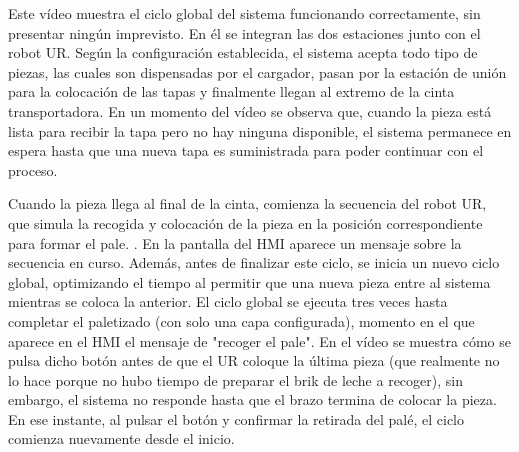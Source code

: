 Este vídeo muestra el ciclo global del sistema funcionando correctamente, sin presentar ningún imprevisto. En él se integran las dos estaciones junto con el robot UR. Según la configuración establecida, el sistema acepta todo tipo de piezas, las cuales son dispensadas por el cargador, pasan por la estación de unión para la colocación de las tapas y finalmente llegan al extremo de la cinta transportadora. En un momento del vídeo se observa que, cuando la pieza está lista para recibir la tapa pero no hay ninguna disponible, el sistema permanece en espera hasta que una nueva tapa es suministrada para poder continuar con el proceso. 

Cuando la pieza llega al final de la cinta, comienza la secuencia del robot UR, que simula la recogida y  colocación de la pieza en la posición correspondiente para formar el pale. . En la pantalla del HMI aparece un mensaje sobre la secuencia en curso. Además, antes de finalizar este ciclo, se inicia un nuevo ciclo global, optimizando el tiempo al permitir que una nueva pieza entre al sistema mientras se coloca la anterior. El ciclo global se ejecuta tres veces hasta completar el paletizado (con solo una capa configurada), momento en el que aparece en el HMI el mensaje de "recoger el pale". En el vídeo se muestra cómo se pulsa dicho botón antes de que el UR coloque la última pieza (que realmente no lo hace porque no hubo tiempo de preparar el brik de leche a recoger), sin embargo, el sistema no responde hasta que el brazo termina de colocar la pieza. En ese instante, al pulsar el botón y confirmar la retirada del palé, el ciclo comienza nuevamente desde el inicio.








